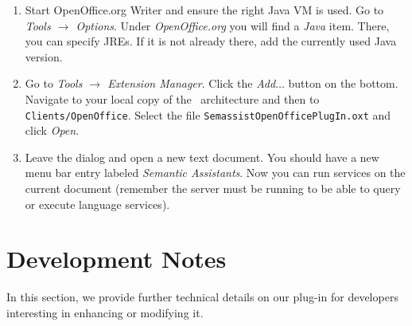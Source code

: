 \begin{enumerate}

  \item Start OpenOffice.org Writer and ensure the right Java VM is
  used. Go to \emph{Tools $\rightarrow$ Options}. Under
  \emph{OpenOffice.org} you will find a \emph{Java} item. There, you
  can specify JREs. If it is not already there, add the currently used
  Java version.
  
  \item Go to \emph{Tools $\rightarrow$ Extension Manager}. Click the
    \emph{Add$\ldots$} button on the bottom. Navigate to your local
    copy of the \sa\ architecture and then to
    \texttt{Clients/OpenOffice}. Select the file
    \texttt{SemassistOpenOfficePlugIn.oxt} and click \emph{Open}.

  \item Leave the dialog and open a new text document. You should have
    a new menu bar entry labeled \emph{Semantic Assistants}. Now you
    can run services on the current document (remember the server must
    be running to be able to query or execute language services).
\end{enumerate}


\section{Development Notes}
\label{sec:oo-spec}
In this section, we provide further technical details on our plug-in
for developers interesting in enhancing or modifying it.

